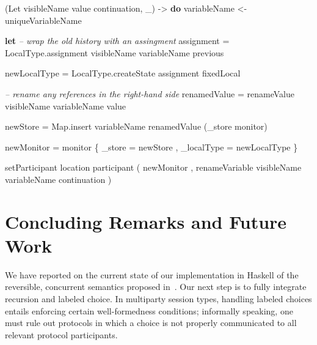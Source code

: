 \documentclass[runningheads]{llncs}
\newenvironment{Shaded}{}{}
\newcommand{\KeywordTok}[1]{\textcolor[rgb]{0.00,0.44,0.13}{\textbf{#1}}}
\newcommand{\DataTypeTok}[1]{\textcolor[rgb]{0.56,0.13,0.00}{#1}}
\newcommand{\CommentTok}[1]{\textcolor[rgb]{0.38,0.63,0.69}{\textit{#1}}}
\newcommand{\OtherTok}[1]{\textcolor[rgb]{0.00,0.44,0.13}{#1}}
\newcommand{\FunctionTok}[1]{\textcolor[rgb]{0.02,0.16,0.49}{#1}}
\newcommand{\NormalTok}[1]{#1}
\begin{document}
\begin{Shaded}
\begin{Highlighting}[]
\NormalTok{(}\DataTypeTok{Let}\NormalTok{ visibleName value continuation, _) }\OtherTok{->} \KeywordTok{do}
\NormalTok{    variableName }\OtherTok{<-}\NormalTok{ uniqueVariableName }

    \KeywordTok{let} 
        \CommentTok{-- wrap the old history with an assingment}
\NormalTok{        assignment }\FunctionTok{=} 
\NormalTok{            LocalType.assignment visibleName variableName previous}

\NormalTok{        newLocalType }\FunctionTok{=} 
\NormalTok{            LocalType.createState assignment fixedLocal}

        \CommentTok{-- rename any references in the right-hand side}
\NormalTok{        renamedValue }\FunctionTok{=}\NormalTok{ renameValue visibleName variableName value}

\NormalTok{        newStore }\FunctionTok{=} 
\NormalTok{            Map.insert variableName renamedValue (_store monitor)}

\NormalTok{        newMonitor }\FunctionTok{=}\NormalTok{ monitor }
\NormalTok{            \{ _store }\FunctionTok{=}\NormalTok{ newStore}
\NormalTok{            , _localType }\FunctionTok{=}\NormalTok{ newLocalType }
\NormalTok{            \}  }
    
\NormalTok{    setParticipant location participant }
\NormalTok{        ( newMonitor}
\NormalTok{        , renameVariable visibleName variableName continuation }
\NormalTok{        )}
\end{Highlighting}
\end{Shaded}



\section{Concluding Remarks and Future
Work}\label{concluding-remarks-and-future-work}

We have reported on the current state of our implementation in Haskell
of the reversible, concurrent semantics proposed in~\cite{DBLP:conf/ppdp/MezzinaP17}.
Our next step is to fully integrate recursion and labeled choice. In
multiparty session types, handling labeled choices entails enforcing
certain well-formedness conditions; informally speaking, one must rule
out protocols in which a choice is not properly communicated to all
relevant protocol participants.
\end{document}
